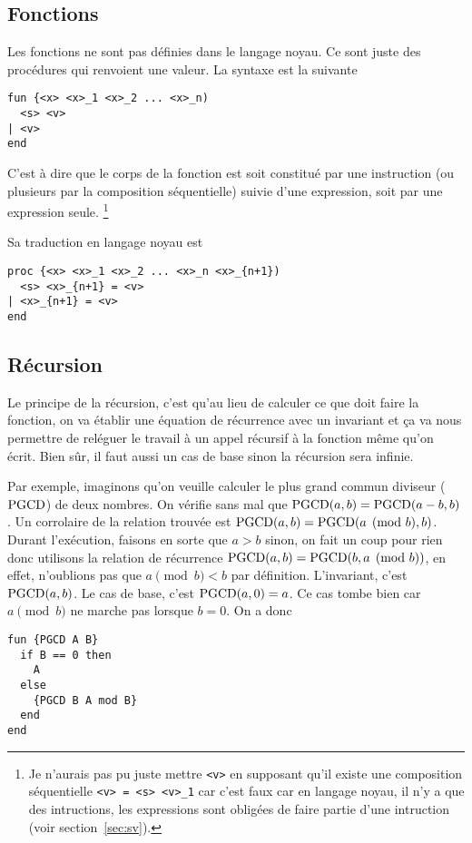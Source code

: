 \subsection{Fonctions}
Les fonctions ne sont pas définies dans le langage noyau.
Ce sont juste des procédures qui renvoient une valeur.
La syntaxe est la suivante
\begin{lstlisting}
fun {<x> <x>_1 <x>_2 ... <x>_n)
  <s> <v>
| <v>
end
\end{lstlisting}
C'est à dire que le corps de la fonction est soit constitué par une
instruction (ou plusieurs par la composition séquentielle)
suivie d'une expression, soit par une expression seule.
\footnote{Je n'aurais pas pu juste mettre \lstinline|<v>| en supposant
qu'il existe une composition
séquentielle \lstinline|<v> = <s> <v>_1| car c'est faux car en langage
noyau, il n'y a que des intructions, les expressions sont obligées de faire
partie d'une intruction (voir section~\ref{sec:sv}).}

Sa traduction en langage noyau est
\begin{lstlisting}
proc {<x> <x>_1 <x>_2 ... <x>_n <x>_{n+1})
  <s> <x>_{n+1} = <v>
| <x>_{n+1} = <v>
end
\end{lstlisting}

\subsection{Récursion}
\label{sec:rec}
Le principe de la récursion,
c'est qu'au lieu de calculer ce que doit faire la fonction,
on va établir une équation de récurrence avec un invariant et ça
va nous permettre de reléguer le travail à un appel récursif à la fonction
même qu'on écrit.
Bien sûr, il faut aussi un cas de base sinon la récursion sera
infinie.

Par exemple, imaginons qu'on veuille calculer le plus grand commun
diviseur ($\operatorname{PGCD}$) de deux nombres.
On vérifie sans mal que $\operatorname{PGCD}(a, b) = \operatorname{PGCD}(a-b, b)$.
Un corrolaire de la relation trouvée est
$\operatorname{PGCD}(a, b) = \operatorname{PGCD}(a \pmod{b}, b)$.
Durant l'exécution, faisons en sorte que $a > b$
sinon, on fait un coup pour rien donc utilisons
la relation de récurrence
$\operatorname{PGCD}(a, b) = \operatorname{PGCD}(b, a \pmod{b})$, en effet, n'oublions pas que
$a \pmod{b} < b$ par définition.
L'invariant, c'est $\operatorname{PGCD}(a,b)$.
Le cas de base, c'est $\operatorname{PGCD}(a, 0) = a$.
Ce cas tombe bien car $a \pmod{b}$ ne marche pas lorsque $b = 0$.
On a donc
\begin{lstlisting}
fun {PGCD A B}
  if B == 0 then
    A
  else
    {PGCD B A mod B}
  end
end
\end{lstlisting}

